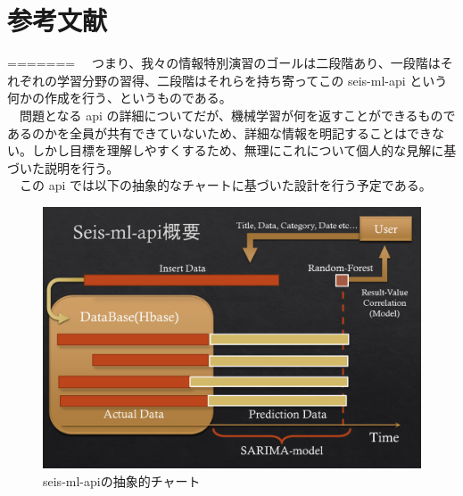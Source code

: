 \documentclass{scrartcl}
\begin{document}
\begin{table}[htbp]
\section{参考文献}
\label{sec:org413c898}
=======
　つまり、我々の情報特別演習のゴールは二段階あり、一段階はそれぞれの学習分野の習得、二段階はそれらを持ち寄ってこの seis-ml-api という何かの作成を行う、というものである。\\
　問題となる api の詳細についてだが、機械学習が何を返すことができるものであるのかを全員が共有できていないため、詳細な情報を明記することはできない。しかし目標を理解しやすくするため、無理にこれについて個人的な見解に基づいた説明を行う。\\
　この api では以下の抽象的なチャートに基づいた設計を行う予定である。\\

\begin{figure}[htbp]
\centering
\includegraphics[width=15cm]{./idea-1.png}
\caption{seis-ml-apiの抽象的チャート}
\end{figure}


\end{table}
\end{document}
